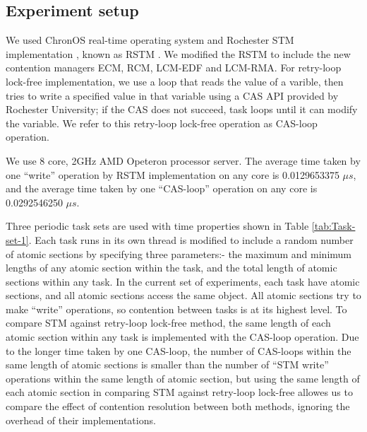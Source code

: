 \documentclass[conference]{sig-alternate}
\begin{document}
\subsection{Experiment setup}
We used ChronOS real-time operating system \cite{dellinger2011chronos}
and Rochester STM implementation \cite{marathe2006lowering}, known
as RSTM . We modified the RSTM to include the new contention managers
ECM, RCM, LCM-EDF and LCM-RMA. For retry-loop lock-free implementation,
we use a loop that reads the value of a varible, then tries to write
a specified value in that variable using a CAS API provided by Rochester
University; if the CAS does not succeed, task loops until it can modify
the variable. We refer to this retry-loop lock-free operation as CAS-loop
operation.

We use 8 core, 2GHz AMD Opeteron processor server. The average time
taken by one {}``write'' operation by RSTM implementation on any
core is 0.0129653375 \textbf{$\mu s$}, and the average time taken
by one {}``CAS-loop'' operation on any core is 0.0292546250 $\mu s$.

Three periodic task sets are used with time properties shown in Table
\ref{tab:Task-set-1}. Each task runs in its own thread is modified to include a random number
of atomic sections by specifying three parameters:- the maximum and
minimum lengths of any atomic section within the task, and the total
length of atomic sections within any task. In the current set of experiments, each task have atomic sections, and all atomic sections access the same object. All atomic sections
try to make ``write'' operations, so contention between tasks is at its highest
level. To compare STM against retry-loop lock-free method, the same
length of each atomic section within any task is implemented with
the CAS-loop operation. Due to the longer time taken by one CAS-loop,
the number of CAS-loops within the same length of atomic sections
is smaller than the number of {}``STM write'' operations within
the same length of atomic section, but using the same length of each
atomic section in comparing STM against retry-loop lock-free allowes
us to compare the effect of contention resolution between both methods,
ignoring the overhead of their implementations.
\end{document}
